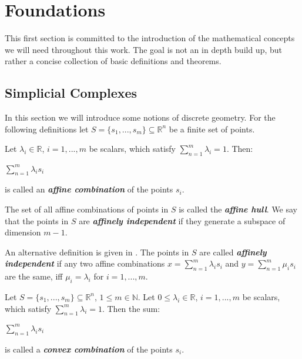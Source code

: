 \chapter{Foundations}

This first section is committed to the introduction of the mathematical concepts we will need throughout this work. The goal is not an in depth build up, but rather a concise collection of basic definitions and theorems.

\section{Simplicial Complexes} \label{sec:Simplicial Complexes}
In this section we will introduce some notions of discrete geometry. For the following definitions let $S = \{s_1,...,s_m\} \subseteq \mathbb{R}^n$ be a finite set of points.

\begin{defi}
Let $\lambda_i \in \mathbb{R}$, $i = 1,...,m$ be scalars, which satisfy $\sum\limits_{n=1}^m \lambda_i = 1$. Then:
\begin{center}
$\sum\limits_{n=1}^m \lambda_i s_i$
\end{center}
is called an  \textit{\textbf{affine combination}} of the points $s_i$. \cite[Definition 2.11]{Polyhedral+and+Algebraic+Methods}
\end{defi}

\begin{defi}
The set of all affine combinations of points in $S$ is called the  \textit{\textbf{affine hull}}. We say that the points in $S$ are \textit{\textbf{affinely independent}} if they generate a subspace of dimension $m-1$. \cite[Definition 2.11]{Polyhedral+and+Algebraic+Methods}
\end{defi}


An alternative definition is given in \cite[III.1, paragraph 3]{Computational+Topology}. The points in $S$ are called  \textit{\textbf{affinely independent}} if any two affine combinations $x = \sum\limits_{n=1}^m \lambda_i s_i$ and $y = \sum\limits_{n=1}^m \mu_i s_i$ are the same, iff $\mu_i = \lambda_i$ for $i = 1,...,m$.


\begin{defi}
Let $S = \{s_1,...,s_m\} \subseteq \mathbb{R}^n$, $1 \leq m \in \mathbb{N}$. Let $0 \leq \lambda_i \in \mathbb{R}$, $i = 1,...,m$ be scalars, which satisfy $\sum\limits_{n=1}^m \lambda_i = 1$. Then the sum:
\begin{center}
$\sum\limits_{n=1}^m \lambda_i s_i$
\end{center}
is called a  \textit{\textbf{convex combination}} of the points $s_i$. \cite[Definition 2.12]{Polyhedral+and+Algebraic+Methods}
\end{defi}

